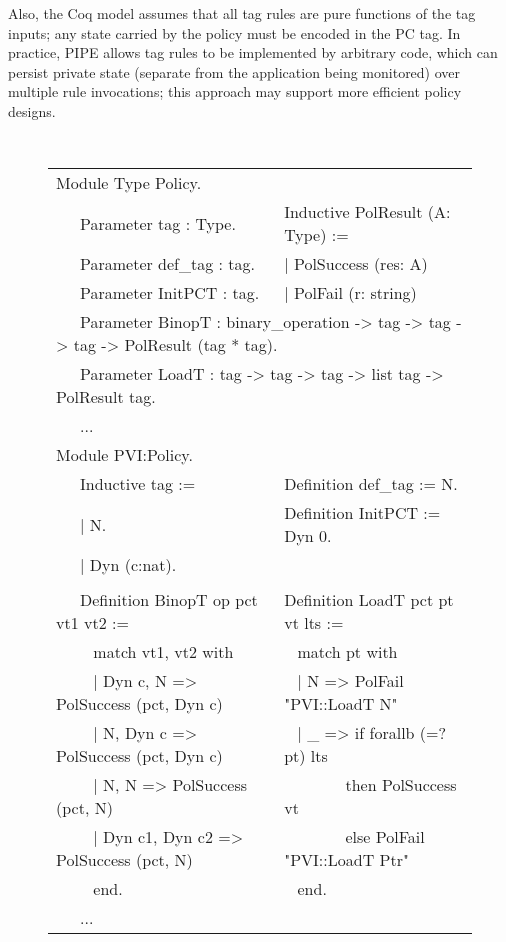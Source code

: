 Also, the Coq model assumes that all tag rules are pure functions of the tag inputs;
any state carried by the policy must be encoded in the PC tag.
In practice, PIPE allows tag rules to be implemented by arbitrary code, which can  persist
private state (separate from the application being monitored) over multiple
rule invocations; this approach may support more efficient policy designs.

\begin{figure}[t]

  {\tt \scriptsize
    \begin{tabular}{l l}
      Module Type Policy. \\[0.5em]

      \ \ \ Parameter tag : Type.     & Inductive PolResult (A: Type) := \\
      \ \ \  Parameter def\_tag : tag. & | PolSuccess (res: A) \\
      \ \ \ Parameter InitPCT : tag.  & | PolFail (r: string) \\[0.5em]
  
      \multicolumn{2}{l}{\ \ \ Parameter BinopT : binary\_operation ->
        tag -> tag -> tag -> PolResult (tag * tag).} \\
      \multicolumn{2}{l}{\ \ \ Parameter LoadT : tag -> tag -> tag ->
        list tag -> PolResult tag.} \\

      \ \ \ ... \\[1em]

      Module PVI:Policy. \\[0.5em]

      \ \ \ Inductive tag := & Definition def\_tag := N.  \\
      \ \ \ | N. & Definition InitPCT := Dyn 0. \\
      \ \ \ | Dyn (c:nat). &  \\
      & \\[0.5em]

      \ \ \ Definition BinopT op pct vt1 vt2 :=       & Definition LoadT pct pt vt lts := \\
      \ \ \ ~ match vt1, vt2 with                     & ~ match pt with \\
      \ \ \ ~ | Dyn c, N =>  PolSuccess (pct, Dyn c)  & ~ | N => PolFail "PVI::LoadT N" \\
      \ \ \ ~ | N, Dyn c => PolSuccess (pct, Dyn c)   & ~ | \_ => if forallb (=? pt) lts \\
      \ \ \ ~ | N, N => PolSuccess (pct, N)           & ~ ~ ~ ~ ~then PolSuccess vt \\
      \ \ \ ~ | Dyn c1, Dyn c2 => PolSuccess (pct, N) &  ~ ~ ~ ~ ~else PolFail "PVI::LoadT Ptr" \\
      \ \ \ ~ end.                                    & ~ end. \\
      \ \ \ ... \\[1em]
    \end{tabular}
    
}
\end{figure}
